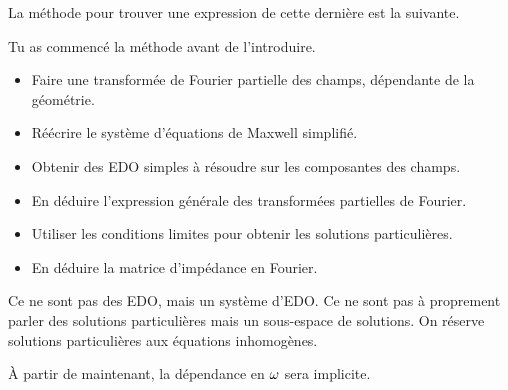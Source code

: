 La méthode pour trouver une expression de cette dernière est la suivante.
\begin{REM}
    Tu as commencé la méthode avant de l'introduire.
\end{REM}
\begin{itemize}
    \item Faire une transformée de Fourier partielle des champs, dépendante de la géométrie.
    \item Réécrire le système d'équations de Maxwell simplifié.
    \item Obtenir des EDO simples à résoudre sur les composantes des champs.
    \item En déduire l'expression générale des transformées partielles de Fourier.
    \item Utiliser les conditions limites pour obtenir les solutions particulières.
    \item En déduire la matrice d'impédance en Fourier.
\end{itemize}
\begin{REM}
    Ce ne sont pas des EDO, mais un système d'EDO.
    Ce ne sont pas à proprement parler des solutions particulières mais un sous-espace de solutions. On réserve solutions particulières aux équations inhomogènes.
\end{REM}
À partir de maintenant, la dépendance en \(\omega\) sera implicite.

